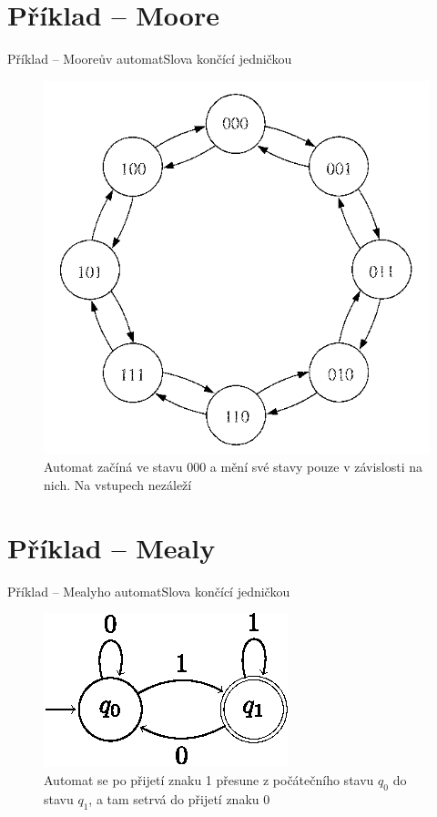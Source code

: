\documentclass{beamer}
\begin{document}
\section{Příklad -- Moore}
\begin{frame}{Příklad -- Mooreův automat}{Slova končící jedničkou}
  \begin{figure}[h]
      \centering
      \includegraphics[scale=0.25]{citac_moore.png}
      \caption{Automat začíná ve stavu 000 a mění své stavy pouze v závislosti na nich. Na vstupech nezáleží}
      \label{fig:my_label}
  \end{figure}
\end{frame}

\section{Příklad -- Mealy}
\begin{frame}{Příklad -- Mealyho automat}{Slova končící jedničkou}
  \begin{figure}
      \centering
      \includegraphics[scale=2]{fsm.eps}
      \caption{Automat se po přijetí znaku 1 přesune z počátečního stavu $q_0$ do stavu $q_1$, a tam setrvá do přijetí znaku 0}
      \label{fig:my_label}
  \end{figure}
\end{frame}
\end{document}
